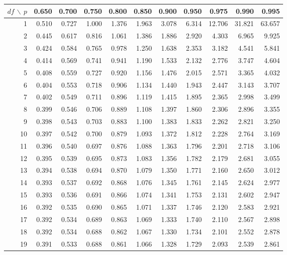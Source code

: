 \begin{center}
  \begin{tabular}{|r|*{10}{r}|}
  \hline   $df\, \backslash \, p$  &  0.650 & 0.700 & 0.750 & 0.800 & 0.850 &
    0.900 & 0.950 & 0.975 & 0.990 & 0.995 \\
\hline 1 &  0.510 &  0.727 &  1.000 &  1.376 &  1.963 &  3.078 &  6.314 & 12.706 & 31.821 & 63.657 \\ 
2 & 0.445 & 0.617 & 0.816 & 1.061 & 1.386 & 1.886 & 2.920 & 4.303 & 6.965 & 9.925 \\ 
3 & 0.424 & 0.584 & 0.765 & 0.978 & 1.250 & 1.638 & 2.353 & 3.182 & 4.541 & 5.841 \\ 
4 & 0.414 & 0.569 & 0.741 & 0.941 & 1.190 & 1.533 & 2.132 & 2.776 & 3.747 & 4.604 \\ 
5 & 0.408 & 0.559 & 0.727 & 0.920 & 1.156 & 1.476 & 2.015 & 2.571 & 3.365 & 4.032 \\ 
6 & 0.404 & 0.553 & 0.718 & 0.906 & 1.134 & 1.440 & 1.943 & 2.447 & 3.143 & 3.707 \\ 
7 & 0.402 & 0.549 & 0.711 & 0.896 & 1.119 & 1.415 & 1.895 & 2.365 & 2.998 & 3.499 \\ 
8 & 0.399 & 0.546 & 0.706 & 0.889 & 1.108 & 1.397 & 1.860 & 2.306 & 2.896 & 3.355 \\ 
9 & 0.398 & 0.543 & 0.703 & 0.883 & 1.100 & 1.383 & 1.833 & 2.262 & 2.821 & 3.250 \\ 
10 & 0.397 & 0.542 & 0.700 & 0.879 & 1.093 & 1.372 & 1.812 & 2.228 & 2.764 & 3.169 \\ 
11 & 0.396 & 0.540 & 0.697 & 0.876 & 1.088 & 1.363 & 1.796 & 2.201 & 2.718 & 3.106 \\ 
12 & 0.395 & 0.539 & 0.695 & 0.873 & 1.083 & 1.356 & 1.782 & 2.179 & 2.681 & 3.055 \\ 
13 & 0.394 & 0.538 & 0.694 & 0.870 & 1.079 & 1.350 & 1.771 & 2.160 & 2.650 & 3.012 \\ 
14 & 0.393 & 0.537 & 0.692 & 0.868 & 1.076 & 1.345 & 1.761 & 2.145 & 2.624 & 2.977 \\ 
15 & 0.393 & 0.536 & 0.691 & 0.866 & 1.074 & 1.341 & 1.753 & 2.131 & 2.602 & 2.947 \\ 
16 & 0.392 & 0.535 & 0.690 & 0.865 & 1.071 & 1.337 & 1.746 & 2.120 & 2.583 & 2.921 \\ 
17 & 0.392 & 0.534 & 0.689 & 0.863 & 1.069 & 1.333 & 1.740 & 2.110 & 2.567 & 2.898 \\ 
18 & 0.392 & 0.534 & 0.688 & 0.862 & 1.067 & 1.330 & 1.734 & 2.101 & 2.552 & 2.878 \\ 
19 & 0.391 & 0.533 & 0.688 & 0.861 & 1.066 & 1.328 & 1.729 & 2.093 & 2.539 & 2.861 \\ 

\end{tabular}
\end{center}
